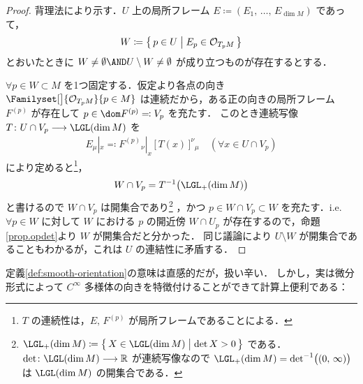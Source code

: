 \documentclass[geometry_main]{subfiles}
\begin{document}
\begin{proof}
    背理法により示す．$U$ 上の局所フレーム $E \coloneqq (E_1,\, \dots,\, E_{\dim M})$ であって，
    \begin{align}
        W \coloneqq \bigl\{\, p \in U \bigm| E_p \in \mathcal{O}_{T_p M} \,\bigr\} 
    \end{align}
    とおいたときに $W \neq \emptyset \AND U \setminus W \neq \emptyset$ が成り立つものが存在するとする．
    
	$\forall p \in W \subset M$ を1つ固定する．仮定より各点の向き $\Familyset[\big]{\mathcal{O}_{T_p M}}{p \in M}$ は連続だから，ある正の向きの局所フレーム $F^{(p)}$ が存在して $p \in \dom F^{(p)} \eqqcolon V_p$ を充たす．
	このとき連続写像 $T \colon U \cap V_p \lto \LGL(\dim M)$ を
	\begin{align}
		E_\mu|_x \eqqcolon F^{(p)}{}_\nu|_x\, \bigl[\, T(x)\,\bigr]^\nu{}_\mu\quad (\forall x \in U \cap V_p)
	\end{align}
	により定めると\footnote{$T$ の連続性は，$E,\, F^{(p)}$ が局所フレームであることによる．}，
	\begin{align}
		W \cap V_p = T^{-1}\bigl( \LGL_+ (\dim M) \bigr) 
	\end{align}
	と書けるので $W \cap V_p$ は開集合であり\footnote{$\LGL_+ (\dim M) \coloneqq \bigl\{\, X \in \LGL (\dim M) \bigm| \det X > 0 \,\bigr\}$ である．$\det \colon \LGL(\dim M) \lto \mathbb{R}$ が連続写像なので $\LGL_+ (\dim M) = \det^{-1} \bigl( (0,\, \infty) \bigr)$ は $\LGL (\dim M)$ の開集合である．} 
	，かつ $p \in W \cap V_p \subset W$ を充たす．i.e. $\forall p \in W$ に対して $W$ における $p$ の開近傍 $W \cap U_p$ が存在するので，命題\ref{prop.opdet}より $W$ が開集合だと分かった．
    同じ議論により $U \setminus W$ が開集合であることもわかるが，これは $U$ の連結性に矛盾する．
\end{proof}

定義\ref{def:smooth-orientation}の意味は直感的だが，扱い辛い．
しかし，実は微分形式によって $C^\infty$ 多様体の向きを特徴付けることができて計算上便利である：
\end{document}
